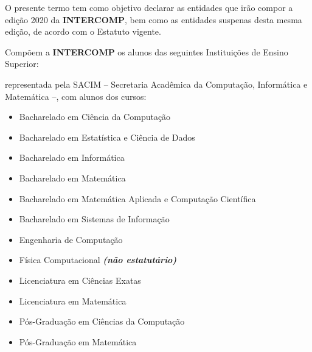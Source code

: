 
\begin{article}
	\label{art:introducao}
	O presente termo tem como objetivo declarar as entidades que irão compor a edição 2020 da \textbf{INTERCOMP}, bem como as entidades suspenas desta mesma edição, de acordo com o Estatuto vigente.
\end{article}

\begin{article}
	\label{art:integrantes}
	Compõem a \textbf{INTERCOMP} os alunos das seguintes Instituições de Ensino Superior:
	\begin{description}[noitemsep]
		\item[USP - São Carlos] representada pela SACIM -- Secretaria Acadêmica da Computação, Informática e Matemática --, com alunos dos cursos:
		\begin{itemize}[noitemsep]
			\item Bacharelado em Ciência da Computação
			\item Bacharelado em Estatística e Ciência de Dados
			\item Bacharelado em Informática
			\item Bacharelado em Matemática
			\item Bacharelado em Matemática Aplicada e Computação Científica
			\item Bacharelado em Sistemas de Informação
			\item Engenharia de Computação
			\item Física Computacional \textbf{\textit{(não estatutário)}}
			\item Licenciatura em Ciências Exatas
			\item Licenciatura em Matemática
			\item Pós-Graduação em Ciências da Computação
			\item Pós-Graduação em Matemática
		\end{itemize}


\end{description}
\end{article}
